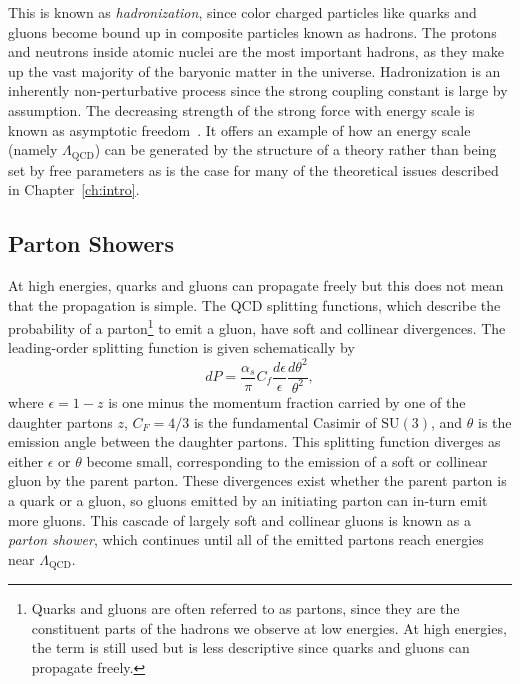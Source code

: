 This is known as \textit{hadronization}, since color charged particles like quarks and gluons become bound up in composite particles known as hadrons.
The protons and neutrons inside atomic nuclei are the most important hadrons, as they make up the vast majority of the baryonic matter in the universe.
Hadronization is an inherently non-perturbative process since the strong coupling constant is large by assumption.
The decreasing strength of the strong force with energy scale is known as asymptotic freedom~\cite{Gross:1973id, Politzer:1973fx}.
It offers an example of how an energy scale (namely $\Lambda_{\mathrm{QCD}}$) can be generated by the structure of a theory rather than being set by free parameters as is the case for many of the theoretical issues described in Chapter~\ref{ch:intro}.

\subsection{Parton Showers}

At high energies, quarks and gluons can propagate freely but this does not mean that the propagation is simple.
The QCD splitting functions, which describe the probability of a parton\footnote{Quarks and gluons are often referred to as partons, since they are the constituent parts of the hadrons we observe at low energies. At high energies, the term is still used but is less descriptive since quarks and gluons can propagate freely.} to emit a gluon, have soft and collinear divergences.
The leading-order splitting function is given schematically by
\begin{equation}
  dP = \frac{\alpha_s}{\pi} C_f \frac{d\epsilon}{\epsilon}\frac{d\theta^2}{\theta^2},
  \label{eqn:splitting}
\end{equation}
where $\epsilon = 1 - z$ is one minus the momentum fraction carried by one of the daughter partons $z$, $C_F = 4/3$ is the fundamental Casimir of $\mathrm{SU}(3)$, and $\theta$ is the emission angle between the daughter partons.
This splitting function diverges as either $\epsilon$ or $\theta$ become small, corresponding to the emission of a soft or collinear gluon by the parent parton.
These divergences exist whether the parent parton is a quark or a gluon, so gluons emitted by an initiating parton can in-turn emit more gluons.
This cascade of largely soft and collinear gluons is known as a \textit{parton shower}, which continues until all of the emitted partons reach energies near $\Lambda_{\mathrm{QCD}}$.

